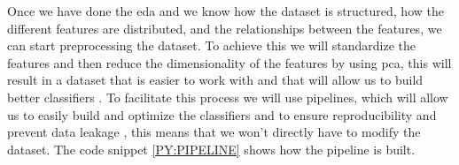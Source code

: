 Once we have done the \ac{eda} and we know how the dataset is structured, how the different features are distributed, and the relationships between the features, we can start preprocessing the dataset. To achieve this we will standardize the features and then reduce the dimensionality of the features by using \ac{pca}, this will result in a dataset that is easier to work with and that will allow us to build better classifiers \cite{dinc_evaluation_2014}. To facilitate this process we will use pipelines, which will allow us to easily build and optimize the classifiers and to ensure reproducibility and prevent data leakage \cite{zhao_pre-process_2019}, this means that we 
won't 
directly have to modify the dataset. The code snippet \ref{PY:PIPELINE} shows how the pipeline is built.

